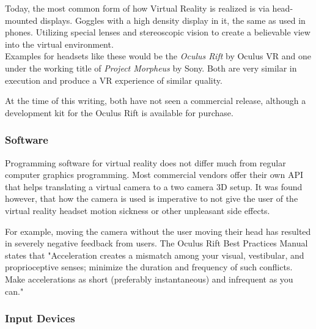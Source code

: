 \documentclass[11pt]{article}
\begin{document}
		Today, the most common form of how Virtual Reality is realized is via head-mounted displays. Goggles with a high density display in it, the same as used in phones. Utilizing special lenses and stereoscopic vision to create a believable view into the virtual environment. \\
		Examples for headsets like these would be the \emph{Oculus Rift} by Oculus VR and one under the working title of \emph{Project Morpheus} by Sony. Both are very similar in execution and produce a VR experience of similar quality. \cite{goradia2014review}
	
	
	At the time of this writing, both have not seen a commercial release, although a development kit for the Oculus Rift is available for purchase.

	\subsubsection{Software}
		Programming software for virtual reality does not differ much from regular computer graphics programming. Most commercial vendors offer their own API that helps translating a virtual camera to a two camera 3D setup. It was found however, that how the camera is used is imperative to not give the user of the virtual reality headset motion sickness or other unpleasant side effects. \cite{seppanen14}
		
		
		For example, moving the camera without the user moving their head has resulted in severely negative feedback from users. The Oculus Rift Best Practices Manual states that "Acceleration creates a mismatch among your visual, vestibular, and proprioceptive senses; minimize the duration and frequency of such conflicts. Make accelerations as short (preferably instantaneous) and infrequent as you can." \cite{yao2014oculus}
	
	\subsubsection{Input Devices}
	
\end{document}
